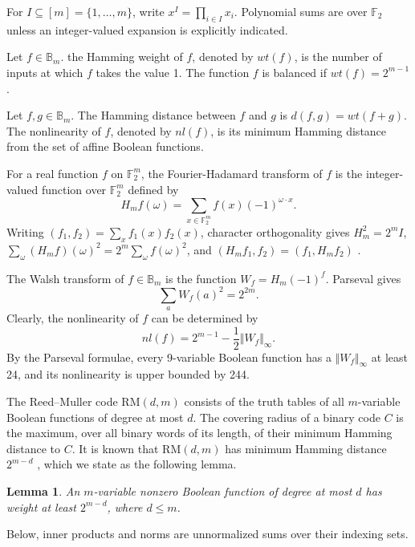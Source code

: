 \documentclass[11pt]{article}
\newtheorem{lemma}{Lemma}
\newtheorem{open problem}{Open problem}
\begin{document}
For $I\subseteq[m]=\{1,\ldots,m\}$, write $x^I=\prod_{i\in I}x_i$. Polynomial sums are over $\mathbb{F}_2$ unless an integer-valued expansion is explicitly indicated.

 Let $f\in \mathbb{B}_m$. the Hamming weight of $f$, denoted by $wt(f)$, is the number of inputs at which $f$ takes the value 1. The function $f$ is  balanced if $wt(f)=2^{m-1}$.

Let $f, g\in \mathbb{B}_m$. The Hamming distance between $f$ and $g$ is $d(f,g)=wt(f+g)$. The nonlinearity of $f$, denoted by $nl(f)$, is its minimum Hamming distance from the set of affine Boolean functions.

For a real function $f$ on $\mathbb{F}_2^m$, the Fourier-Hadamard transform of $f$ is the integer-valued function over $\mathbb{F}_{2}^m$
defined by
\[
H_mf(\omega)=\sum_{x\in \mathbb{F}_{2}^m}f(x)(-1)^{\omega \cdot x}.
\]
Writing $(f_1,f_2)=\sum_{x}f_1(x)f_2(x)$, character orthogonality gives $H_m^2=2^mI$, $\sum_{\omega}(H_mf)(\omega)^2=2^m\sum_{\omega}f(\omega)^2$, and $(H_mf_1,f_2)=(f_1,H_mf_2)$ \cite{Car}.

The Walsh transform of $f\in \mathbb{B}_m$ is the function $W_f=H_m(-1)^f$. Parseval gives
\[
\sum_{a}W_f(a)^2=2^{2m}.
\]
Clearly, the nonlinearity of $f$ can be determined by
\[
nl(f)=2^{m-1}-\frac{1}{2}{\Vert W_f\Vert }_{\infty}.
\]
By the Parseval formulae, every 9-variable Boolean function has a ${\Vert W_f\Vert }_{\infty}$ at least 24, and its nonlinearity is upper bounded by 244.

 The Reed--Muller code RM$(d,m)$ consists of the truth tables of all $m$-variable Boolean functions of degree at most $d$. The covering radius of a binary code $C$ is the maximum, over all binary words of its length, of their minimum Hamming distance to $C$.
It is known that RM$(d,m)$ has minimum Hamming distance $2^{m-d}$ \cite{Car,Kasami1,MC}, which we state as the following lemma.
\begin{lemma}\label{lem:minimum-weight}
An $m$-variable nonzero Boolean function of degree at most $d$ has weight at least $2^{m-d}$, where $d\le m$.
\end{lemma}

Below, inner products and norms are unnormalized sums over their indexing sets.
\end{document}
